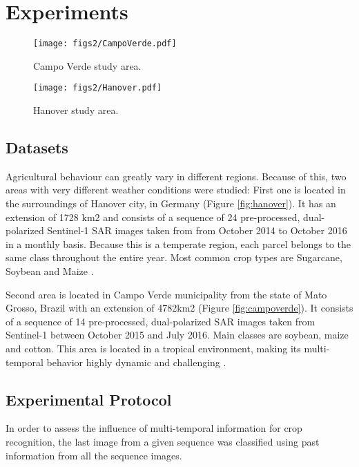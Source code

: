 \section{Experiments}

\begin{figure}[t!]
\label{fig:campoverde}
\centering
\texttt{[image: figs2/CampoVerde.pdf]}
\caption{Campo Verde study area.}
\label{fig:labels}
\end{figure}

\begin{figure}[t!]
\label{fig:hanover}
\centering
\texttt{[image: figs2/Hanover.pdf]}
\caption{Hanover study area.}
\label{fig:labels}
\end{figure}
\subsection{Datasets}

Agricultural behaviour can greatly vary in different regions. Because of this, two areas with very different weather conditions were studied: First one is located in the surroundings of Hanover city, in Germany (Figure \ref{fig:hanover}). It has an extension of 1728 km2 and consists of a sequence of 24 pre-processed, dual-polarized Sentinel-1 SAR images taken from from October 2014 to October 2016 in a monthly basis. Because this is a temperate region, each parcel belongs to the same class throughout the entire year. Most common crop types are Sugarcane, Soybean and Maize \cite{bargiel2017new}.

Second area is located in Campo Verde municipality from the state of Mato Grosso, Brazil with an extension of 4782km2 (Figure \ref{fig:campoverde}). It consists of a sequence of 14 pre-processed, dual-polarized SAR images taken from Sentinel-1 between October 2015 and July 2016. Main classes are soybean, maize and cotton. This area is located in a tropical environment, making its multi-temporal behavior highly dynamic and challenging \cite{sanches2018campo}.






\subsection{Experimental Protocol}

In order to assess the influence of multi-temporal information for crop recognition, the last image from a given sequence was classified using past information from all the sequence images.

